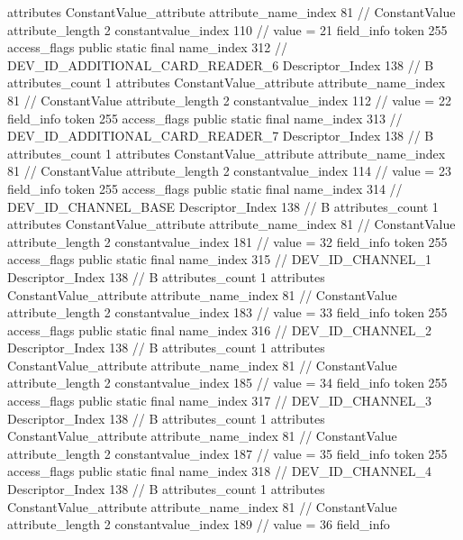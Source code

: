 {{{{{				attributes {
				ConstantValue_attribute {
					attribute_name_index	81		// ConstantValue
					attribute_length	2
					constantvalue_index	110		// value = 21
				}
				}
			}
			field_info {
				token	255
				access_flags	public static final
				name_index	312		// DEV_ID_ADDITIONAL_CARD_READER_6
				Descriptor_Index	138		// B
				attributes_count	1
				attributes {
				ConstantValue_attribute {
					attribute_name_index	81		// ConstantValue
					attribute_length	2
					constantvalue_index	112		// value = 22
				}
				}
			}
			field_info {
				token	255
				access_flags	public static final
				name_index	313		// DEV_ID_ADDITIONAL_CARD_READER_7
				Descriptor_Index	138		// B
				attributes_count	1
				attributes {
				ConstantValue_attribute {
					attribute_name_index	81		// ConstantValue
					attribute_length	2
					constantvalue_index	114		// value = 23
				}
				}
			}
			field_info {
				token	255
				access_flags	public static final
				name_index	314		// DEV_ID_CHANNEL_BASE
				Descriptor_Index	138		// B
				attributes_count	1
				attributes {
				ConstantValue_attribute {
					attribute_name_index	81		// ConstantValue
					attribute_length	2
					constantvalue_index	181		// value = 32
				}
				}
			}
			field_info {
				token	255
				access_flags	public static final
				name_index	315		// DEV_ID_CHANNEL_1
				Descriptor_Index	138		// B
				attributes_count	1
				attributes {
				ConstantValue_attribute {
					attribute_name_index	81		// ConstantValue
					attribute_length	2
					constantvalue_index	183		// value = 33
				}
				}
			}
			field_info {
				token	255
				access_flags	public static final
				name_index	316		// DEV_ID_CHANNEL_2
				Descriptor_Index	138		// B
				attributes_count	1
				attributes {
				ConstantValue_attribute {
					attribute_name_index	81		// ConstantValue
					attribute_length	2
					constantvalue_index	185		// value = 34
				}
				}
			}
			field_info {
				token	255
				access_flags	public static final
				name_index	317		// DEV_ID_CHANNEL_3
				Descriptor_Index	138		// B
				attributes_count	1
				attributes {
				ConstantValue_attribute {
					attribute_name_index	81		// ConstantValue
					attribute_length	2
					constantvalue_index	187		// value = 35
				}
				}
			}
			field_info {
				token	255
				access_flags	public static final
				name_index	318		// DEV_ID_CHANNEL_4
				Descriptor_Index	138		// B
				attributes_count	1
				attributes {
				ConstantValue_attribute {
					attribute_name_index	81		// ConstantValue
					attribute_length	2
					constantvalue_index	189		// value = 36
				}
				}
			}
			field_info {
}}}}}

